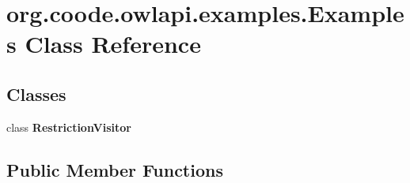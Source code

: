 \hypertarget{classorg_1_1coode_1_1owlapi_1_1examples_1_1_examples}{\section{org.\-coode.\-owlapi.\-examples.\-Examples Class Reference}
\label{classorg_1_1coode_1_1owlapi_1_1examples_1_1_examples}
}
\subsection*{Classes}
\begin{DoxyCompactItemize}
\item 
class {\bfseries Restriction\-Visitor}
\end{DoxyCompactItemize}
\subsection*{Public Member Functions}
